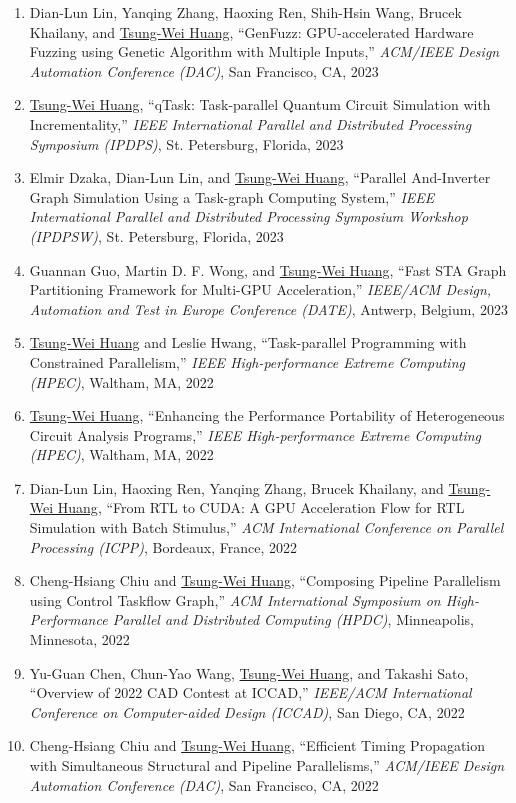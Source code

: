 \documentclass[A4,11pt]{article}
\begin{document}
\begin{enumerate}
    \item Dian-Lun Lin, Yanqing Zhang, Haoxing Ren, Shih-Hsin Wang, Brucek Khailany, and \underline{Tsung-Wei Huang}, ``GenFuzz: GPU-accelerated Hardware Fuzzing using Genetic Algorithm with Multiple Inputs,'' \textit{ACM/IEEE Design Automation Conference (DAC)}, San Francisco, CA, 2023
    \item \underline{Tsung-Wei Huang}, ``qTask: Task-parallel Quantum Circuit Simulation with Incrementality,'' \textit{IEEE International Parallel and Distributed Processing Symposium (IPDPS)}, St. Petersburg, Florida, 2023 
    \item Elmir Dzaka, Dian-Lun Lin, and \underline{Tsung-Wei Huang}, ``Parallel And-Inverter Graph Simulation Using a Task-graph Computing System,'' \textit{IEEE International Parallel and Distributed Processing Symposium Workshop (IPDPSW)}, St. Petersburg, Florida, 2023 
    \item Guannan Guo, Martin D. F. Wong, and \underline{Tsung-Wei Huang}, ``Fast STA Graph Partitioning Framework for Multi-GPU Acceleration,'' \textit{IEEE/ACM Design, Automation and Test in Europe Conference (DATE)}, Antwerp, Belgium, 2023
    \item \underline{Tsung-Wei Huang} and Leslie Hwang, ``Task-parallel Programming with Constrained Parallelism,'' \textit{IEEE High-performance Extreme Computing (HPEC)}, Waltham, MA, 2022
    \item \underline{Tsung-Wei Huang}, ``Enhancing the Performance Portability of Heterogeneous Circuit Analysis Programs,'' \textit{IEEE High-performance Extreme Computing (HPEC)}, Waltham, MA, 2022
    \item Dian-Lun Lin, Haoxing Ren, Yanqing Zhang, Brucek Khailany, and \underline{Tsung-Wei Huang}, ``From RTL to CUDA: A GPU Acceleration Flow for RTL Simulation with Batch Stimulus,'' \textit{ACM International Conference on Parallel Processing (ICPP)}, Bordeaux, France, 2022
    \item Cheng-Hsiang Chiu and \underline{Tsung-Wei Huang}, ``Composing Pipeline Parallelism using Control Taskflow Graph,'' \textit{ACM International Symposium on High-Performance Parallel and Distributed Computing (HPDC)}, Minneapolis, Minnesota, 2022
    \item Yu-Guan Chen, Chun-Yao Wang, \underline{Tsung-Wei Huang}, and Takashi Sato, ``Overview of 2022 CAD Contest at ICCAD,'' \textit{IEEE/ACM International Conference on Computer-aided Design (ICCAD)}, San Diego, CA, 2022
    \item Cheng-Hsiang Chiu and \underline{Tsung-Wei Huang}, ``Efficient Timing Propagation with Simultaneous Structural and Pipeline Parallelisms,'' \textit{ACM/IEEE Design Automation Conference (DAC)}, San Francisco, CA, 2022 

\end{enumerate}
\end{document}
